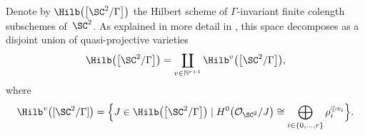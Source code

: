  Denote by $\Hilb\big(\big[\SC^2/\Gamma\big]\big)$ the Hilbert scheme of $\Gamma$-invariant finite colength subschemes of~$\SC^2$. As explained in more detail in \cite[Section~1.1]{gyenge2018euler}, this space decomposes as a disjoint union of quasi-projective varieties
\[\Hilb\big(\big[\SC^2/\Gamma\big]\big) = \coprod_{v\in \mathbb{N}^{r+1}}\Hilb^v\big(\big[\SC^2/\Gamma\big]\big),
\]
where \[\Hilb^v\big([\SC^2/\Gamma]\big) =\Big\{J\in \Hilb\big(\big[\SC^2/\Gamma\big]\big)\mid H^0\big(\mathcal{O}_{\SC^2}/J\big) \cong \bigoplus_{i\in \{0, \dots, r\}} \rho_i^{\oplus v_i}\Big\}.\]
